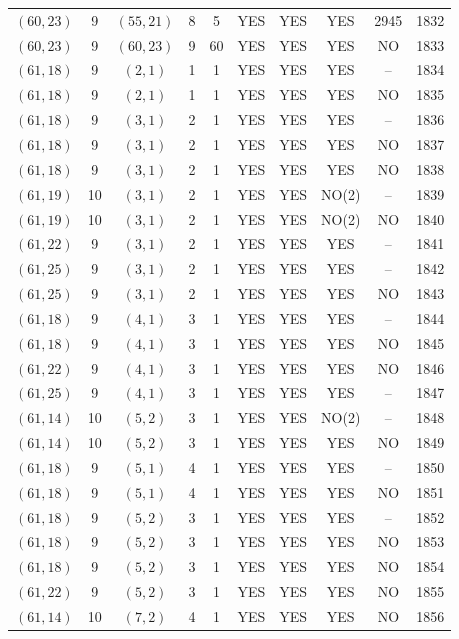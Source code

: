 \begin{longtable}{|c|c|c|c|c|c|c|c|c|c|}
$(60, 23)$ & 9 & $(55, 21)$ & 8 & 5 & YES & YES & YES & 2945 & 1832\\
$(60, 23)$ & 9 & $(60, 23)$ & 9 & 60 & YES & YES & YES & NO & 1833\\
$(61, 18)$ & 9 & $(2, 1)$ & 1 & 1 & YES & YES & YES & -- & 1834\\
$(61, 18)$ & 9 & $(2, 1)$ & 1 & 1 & YES & YES & YES & NO & 1835\\
$(61, 18)$ & 9 & $(3, 1)$ & 2 & 1 & YES & YES & YES & -- & 1836\\
$(61, 18)$ & 9 & $(3, 1)$ & 2 & 1 & YES & YES & YES & NO & 1837\\
$(61, 18)$ & 9 & $(3, 1)$ & 2 & 1 & YES & YES & YES & NO & 1838\\
$(61, 19)$ & 10 & $(3, 1)$ & 2 & 1 & YES & YES & NO(2) & -- & 1839\\
$(61, 19)$ & 10 & $(3, 1)$ & 2 & 1 & YES & YES & NO(2) & NO & 1840\\
$(61, 22)$ & 9 & $(3, 1)$ & 2 & 1 & YES & YES & YES & -- & 1841\\
$(61, 25)$ & 9 & $(3, 1)$ & 2 & 1 & YES & YES & YES & -- & 1842\\
$(61, 25)$ & 9 & $(3, 1)$ & 2 & 1 & YES & YES & YES & NO & 1843\\
$(61, 18)$ & 9 & $(4, 1)$ & 3 & 1 & YES & YES & YES & -- & 1844\\
$(61, 18)$ & 9 & $(4, 1)$ & 3 & 1 & YES & YES & YES & NO & 1845\\
$(61, 22)$ & 9 & $(4, 1)$ & 3 & 1 & YES & YES & YES & NO & 1846\\
$(61, 25)$ & 9 & $(4, 1)$ & 3 & 1 & YES & YES & YES & -- & 1847\\
$(61, 14)$ & 10 & $(5, 2)$ & 3 & 1 & YES & YES & NO(2) & -- & 1848\\
$(61, 14)$ & 10 & $(5, 2)$ & 3 & 1 & YES & YES & YES & NO & 1849\\
$(61, 18)$ & 9 & $(5, 1)$ & 4 & 1 & YES & YES & YES & -- & 1850\\
$(61, 18)$ & 9 & $(5, 1)$ & 4 & 1 & YES & YES & YES & NO & 1851\\
$(61, 18)$ & 9 & $(5, 2)$ & 3 & 1 & YES & YES & YES & -- & 1852\\
$(61, 18)$ & 9 & $(5, 2)$ & 3 & 1 & YES & YES & YES & NO & 1853\\
$(61, 18)$ & 9 & $(5, 2)$ & 3 & 1 & YES & YES & YES & NO & 1854\\
$(61, 22)$ & 9 & $(5, 2)$ & 3 & 1 & YES & YES & YES & NO & 1855\\
$(61, 14)$ & 10 & $(7, 2)$ & 4 & 1 & YES & YES & YES & NO & 1856\\

\end{longtable}
